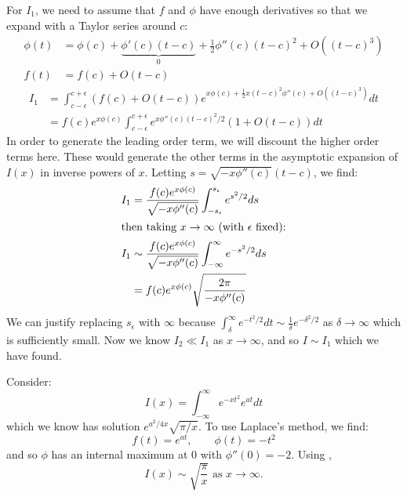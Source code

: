 \documentclass[../Main.tex]{subfiles}
\begin{document}
For $I_1$, we need to assume that $f$ and $\phi$ have enough derivatives so that we expand with a Taylor series around $c$:
\begin{align*}
    \phi(t) &=\phi(c) + \underbrace{\phi'(c)(t - c)}_0 + \frac12 \phi''(c)(t - c)^2 + O((t - c)^3) \\
    f(t) &= f(c) + O(t - c)
\end{align*}
\begin{align*}
    I_1 &= \int_{c - \epsilon}^{c + \epsilon} \left(f(c) + O(t - c)\right)e^{x\phi(c) + \frac12x (t - c)^2 \phi''(c) + O((t - c)^3)} dt \\
    &= f(c) e^{x\phi(c)} \int_{c - \epsilon}^{c + \epsilon} e^{x\phi''(c) (t - c)^2 / 2} (1 + O(t - c)) dt
\end{align*}
In order to generate the leading order term, we will discount the higher order terms here. These would generate the other terms in the asymptotic expansion of $I(x)$ in inverse powers of $x$. Letting $s = \sqrt{-x\phi''(c)}(t-c)$, we find:
\begin{align}
    I_1 &= \frac{f(c) e^{x\phi(c)}}{\sqrt{-x\phi''(c)}} \int_{-s_\epsilon}^{s_\epsilon} e^{s^2 / 2}ds \nonumber\\
    \intertext{then taking $x \to \infty$ (with $\epsilon$ fixed):}
    I_1 &\sim \frac{f(c)e^{x\phi(c)}}{\sqrt{-x\phi''(c)}} \int_{-\infty}^{\infty} e^{-s^2 / 2} ds \nonumber\\
    &= f(c)e^{x\phi(c)}\sqrt{\frac{2\pi}{-x\phi''(c)}} \label{eqnLaplaceMethod}
\end{align}
We can justify replacing $s_\epsilon$ with $\infty$ because $\int_{\delta}^{\infty} e^{-t^2 / 2} dt \sim \frac1\delta e^{-\delta^2 / 2}$ as $\delta \to \infty$ which is sufficiently small. Now we know $I_2 \ll I_1$ as $x \to \infty$, and so $I \sim I_1$ which we have found.
\begin{example}
    Consider:
    \begin{equation*}
        I(x) = \int_{-\infty}^{\infty} e^{-xt^2} e^{at} dt
    \end{equation*}
    which we know has solution $e^{a^2 / 4x}\sqrt{\pi / x}$. To use Laplace's method, we find:
    \begin{equation*}
        f(t) = e^{at},\qquad \phi(t) = -t^2
    \end{equation*}
    and so $\phi$ has an internal maximum at $0$ with $\phi''(0) = -2$. Using ,
    \begin{equation*}
        I(x) \sim \sqrt{\frac{\pi}{x}} \text{ as } x \to\infty.
    \end{equation*}
\end{example}
\end{document}
